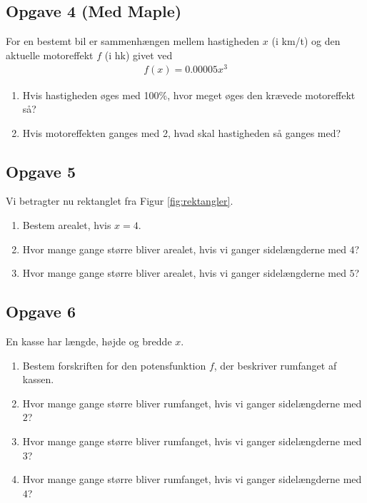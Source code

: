 \subsection*{Opgave 4 (Med Maple)}
For en bestemt bil er sammenhængen mellem hastigheden $x$ (i km/t) og den aktuelle motoreffekt $f$ (i hk) givet ved
\begin{align*}
	f(x) = 0.00005x^3
\end{align*}
\begin{enumerate}[label=\roman*)]
	\item Hvis hastigheden øges med 100$\%$, hvor meget øges den krævede motoreffekt så?
	\item Hvis motoreffekten ganges med 2, hvad skal hastigheden så ganges med?
\end{enumerate}


\subsection*{Opgave 5}
Vi betragter nu rektanglet fra Figur \ref{fig:rektangler}.
\begin{enumerate}[label = \roman*)]
	\item Bestem arealet, hvis $x = 4$.
	\item Hvor mange gange større bliver arealet, hvis vi ganger sidelængderne med $4$?
	\item Hvor mange gange større bliver arealet, hvis vi ganger sidelængderne med $5$?
\end{enumerate}

\subsection*{Opgave 6}
En kasse har længde, højde og bredde $x$. 
\begin{enumerate}[label=\roman*)]
	\item Bestem forskriften for den potensfunktion $f$, der beskriver rumfanget af kassen.
	\item Hvor mange gange større bliver rumfanget, hvis vi ganger sidelængderne med $2$?
	\item Hvor mange gange større bliver rumfanget, hvis vi ganger sidelængderne med $3$?
	\item Hvor mange gange større bliver rumfanget, hvis vi ganger sidelængderne med $4$?
\end{enumerate}



